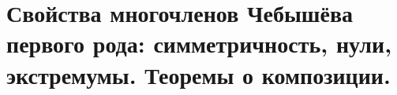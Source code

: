 \section{Свойства многочленов Чебышёва первого рода: симметричность, нули, экстремумы. Теоремы о композиции.}
